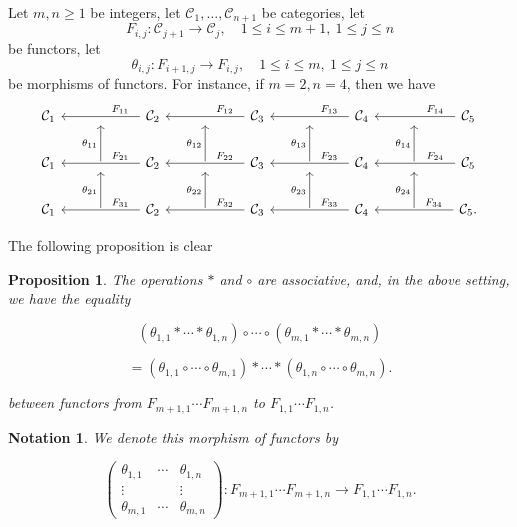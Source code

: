 \documentclass[12pt]{article}%
\newtheorem{prop}[thm]{Proposition}
\newtheorem{nota}[thm]{Notation}
\theoremstyle{remark}
\theoremstyle{definition}
\newcommand{\nn}{\noindent}
\newcommand{\C}{\mathcal C}
\begin{document}
Let $m,n\ge1$ be integers, let $\C_1,\dots,\C_{n+1}$ be categories, let 
$$
F_{i,j}:\C_{j+1}\to\C_j,\quad1\le i\le m+1,\ 1\le j\le n
$$
be functors, let 
$$
\theta_{i,j}:F_{i+1,j}\to F_{i,j},\quad1\le i\le m,\ 1\le j\le n
$$
be morphisms of functors. For instance, if $m=2,n=4$, then we have 
$$
\begin{tikzcd}
%
\C_1&{}&\C_2\ar{ll}{}[near start,swap]{F_{11}}&{}&\C_3\ar{ll}{}[near start,swap]{F_{12}}&{}&\C_4\ar{ll}{}[near start,swap]{F_{13}}&{}&\C_5\ar{ll}{}[near start,swap]{F_{14}}\\ 
%
\C_1&\ar{u}{\theta_{11}}&\C_2\ar{ll}{}[near start,swap]{F_{21}}&\ar{u}{\theta_{12}}&\C_3\ar{ll}{}[near start,swap]{F_{22}}&\ar{u}{\theta_{13}}&\C_4\ar{ll}{}[near start,swap]{F_{23}}&\ar{u}{\theta_{14}}&\C_5\ar{ll}{}[near start,swap]{F_{24}}\\ 
%
\C_1&\ar{u}{\theta_{21}}&\C_2\ar{ll}{}[near start,swap]{F_{31}}&\ar{u}{\theta_{22}}&\C_3\ar{ll}{}[near start,swap]{F_{32}}&\ar{u}{\theta_{23}}&\C_4\ar{ll}{}[near start,swap]{F_{33}}&\ar{u}{\theta_{24}}&\C_5\ar{ll}{}[near start,swap]{F_{34}}.
\end{tikzcd}
$$ 

The following proposition is clear 

\begin{prop}
The operations $*$ and $\circ$ are associative, and, in the above setting, we have the equality 

$$
(\theta_{1,1}*\cdots*\theta_{1,n})\circ\cdots\circ(\theta_{m,1}*\cdots*\theta_{m,n})
$$ 

$$
=(\theta_{1,1}\circ\cdots\circ\theta_{m,1})*\cdots*(\theta_{1,n}\circ\cdots\circ\theta_{m,n}).
$$

\nn between functors from $F_{m+1,1}\cdots F_{m+1,n}$ to $F_{1,1}\cdots F_{1,n}$.
\end{prop}

\begin{nota}\label{nmat}%
We denote this morphism of functors by

$$
\begin{pmatrix}
\theta_{1,1}&\cdots&\theta_{1,n}\\
\vdots&&\vdots\\ 
\theta_{m,1}&\cdots&\theta_{m,n}
\end{pmatrix}:F_{m+1,1}\cdots F_{m+1,n}\to F_{1,1}\cdots F_{1,n}.
$$ 
\end{nota}
\end{document}
